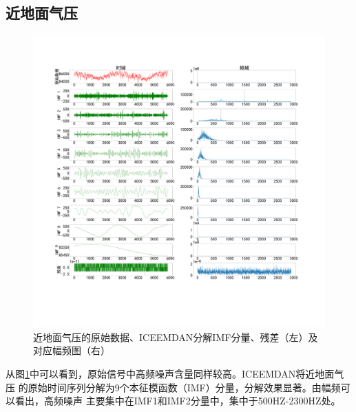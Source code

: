 \documentclass[AutoFakeBold]{LZUThesis}
\begin{document}
\subsection{近地面气压}
\begin{figure}[H]
	\centering
    \includegraphics[width=1\textwidth]{figures/pres.pdf}
    \caption{近地面气压的原始数据、ICEEMDAN分解IMF分量、残差（左）及对应幅频图（右）}
    \label{fig_pres}
\end{figure}

从图\ref{fig_pres}中可以看到，原始信号中高频噪声含量同样较高。ICEEMDAN将近地面气压
的原始时间序列分解为9个本征模函数（IMF）分量，分解效果显著。由幅频可以看出，高频噪声
主要集中在IMF1和IMF2分量中，集中于500HZ-2300HZ处。
\end{document}
